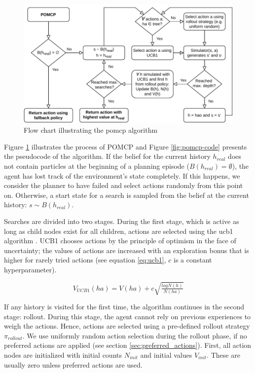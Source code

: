 \begin{figure}[htbp]
    \centerfloat
    \includegraphics[width=1.0\textwidth]{figures/POMCP.pdf}
    \caption{Flow chart illustrating the \acrfull{pomcp} algorithm}
    \label{fig:pomcp}
\end{figure}

Figure \ref{fig:pomcp} illustrates the process of POMCP and Figure \ref{fig:pomcp-code} presents the pseudocode of the algorithm. If the belief for the current history $h_{real}$ does not contain particles at the beginning of a planning episode ($B(h_{real}) = \emptyset$), the agent has lost track of the environment's state completely. If this happens, we consider the planner to have failed and select actions randomly from this point on. Otherwise, a start state for a search is sampled from the belief at the current history: $ s \sim B(h_ {real})$. 

Searches are divided into two stages. During the first stage, which is active as long as child nodes exist for all children, actions are selected using the \acrfull{ucb1} algorithm \parencite{ucb1}. UCB1 chooses actions by the principle of optimism in the face of uncertainty; the values of actions are increased with an exploration bonus that is higher for rarely tried actions (see equation \ref{eq:ucb1}, $c$ is a constant hyperparameter). 

\begin{equation}
    V_{UCB1}(ha) = V(ha) + c\sqrt{\tfrac{log N(h)}{N(ha)}}
    \label{eq:ucb1}
\end{equation}

If any history is visited for the first time, the algorithm continues in the second stage: rollout. During this stage, the agent cannot rely on previous experiences to weigh the actions. Hence, actions are selected using a pre-defined rollout strategy $\pi_{rollout}$. We use uniformly random action selection during the rollout phase, if no preferred actions are applied (see section \ref{sec:preferred_actions}). First, all action nodes are initialized with initial counts $N_{init}$ and initial values $V_{init}$. These are usually zero unless preferred actions are
used.

